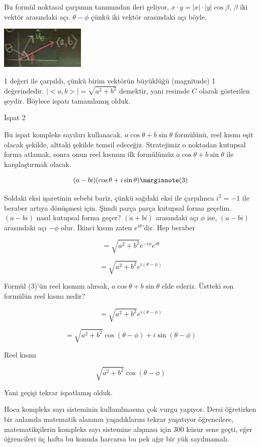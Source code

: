 \documentclass[12pt,fleqn]{article}\usepackage{../../common}
\begin{document}
Bu formül noktasal çarpımın tanımından ileri geliyor, $x \cdot y =
|x|\cdot|y| \cos \beta$, $\beta$ iki vektör arasındaki açı. $\theta - \phi$
çünkü iki vektör arasındaki açı böyle.

\includegraphics[height=2cm]{8_4.png}

1 değeri ile çarpıldı, çünkü birim vektörün büyüklüğü (magnitude) 1
değerindedir. $|<a,b>| = \sqrt{a^2+b^2}$ demektir, yani resimde $C$ olarak
gösterilen şeydir. Böylece ispatı tamamlamış olduk. 

İspat 2

Bu ispat kompleks sayıları kullanacak. $a \cos \theta + b \sin \theta$
formülünü, reel kısmı eşit olacak şekilde, alttaki şekilde temsil
edeceğiz. Stratejimiz o noktadan kutupsal forma atlamak, sonra onun reel
kısmını ilk formülümüz $a \cos \theta + b \sin \theta$ ile karşılaştırmak
olacak. 

$$
(a - bi) (\cos \theta + i\sin \theta) 
\mlabel{3}
$$

Soldaki eksi işaretinin sebebi bariz, çünkü sağdaki eksi ile çarpılınca
$i^2 = -1$ ile beraber artıya dönüşmesi için. Şimdi parça parça kutupsal
forma geçelim. $(a-bi)$ nasıl kutupsal forma geçer? $(a+bi)$ arasındaki açı
$\phi$ ise, $(a-bi)$ arasındaki açı $-\phi$ olur. İkinci kısım zaten
$e^{i\theta}$'dir. Hep beraber

$$ = \sqrt{a^2+b^2}e^{-i\phi} e^{i\theta}$$

$$ = \sqrt{a^2+b^2} e^{i(\theta - \phi) }  $$

Formül (3)'ün reel kısmını alırsak, $a \cos \theta + b \sin \theta$
elde ederiz. Üstteki son formülün reel kısmı nedir? 

$$ = \sqrt{a^2+b^2}e^{i(\theta - \phi)}$$

$$ = \sqrt{a^2+b^2}\cos(\theta - \phi) + i\sin(\theta - \phi) $$

Reel kısmı

$$ \sqrt{a^2+b^2}\cos(\theta - \phi)$$

Yani geçişi tekrar ispatlamış olduk. 

Hoca kompleks sayı sisteminin kullanılmasına çok vurgu yapıyor. Dersi
öğretirken bir anlamda matematik alanının yaşadıklarını tekrar yaşatıyor
öğrencilere, matematikçilerin kompleks sayı sistemine alışması için 300
küsur sene geçti, eğer öğrencileri üç hafta bu konuda harcarsa bu pek ağır
bir yük sayılmamalı.
\end{document}
